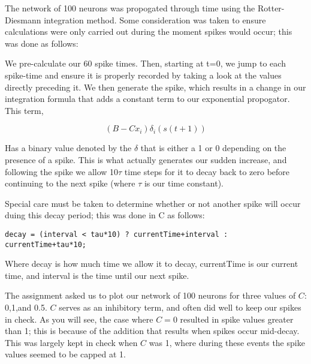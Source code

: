 \documentclass[a4paper,12pt]{article}
\begin{document}
The network of 100 neurons was propogated through time using the Rotter-Diesmann integration method. Some consideration was taken to ensure calculations were only carried out during the moment spikes would occur; this was done as follows:

\vspace{2mm}

We pre-calculate our 60 spike times. Then, starting at t=0, we jump to each spike-time and ensure it is properly recorded by taking a look at the values directly preceding it. We then generate the spike, which results in a change in our integration formula that adds a constant term to our exponential propogator. This term, 

\begin{equation}
(B-Cx_i)\delta_i(s(t+1))
\end{equation}

Has a binary value denoted by the $\delta$ that is either a 1 or 0 depending on the presence of a spike. This is what actually generates our sudden increase, and following the spike we allow 10$\tau$ time steps for it to decay back to zero before continuing to the next spike (where $\tau$ is our time constant).

\vspace{2mm}

Special care must be taken to determine whether or not another spike will occur duing this decay period; this was done in C as follows:

\begin{verbatim}
decay = (interval < tau*10) ? currentTime+interval : currentTime+tau*10;
\end{verbatim}

Where decay is how much time we allow it to decay, currentTime is our current time, and interval is the time until our next spike. 

\vspace{2mm}

The assignment asked us to plot our network of 100 neurons for three values of $C$: 0,1,and 0.5. $C$ serves as an inhibitory term, and often did well to keep our spikes in check. As you will see, the case where $C=0$ resulted in spike values greater than 1; this is because of the addition that results when spikes occur mid-decay. This was largely kept in check when $C$ was 1, where during these events the spike values seemed to be capped at 1. 

\vspace{2mm}
\end{document}
